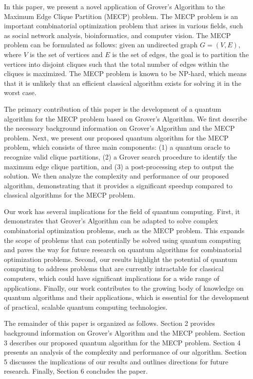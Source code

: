 In this paper, we present a novel application of Grover's Algorithm to the Maximum Edge Clique Partition (MECP) problem. The MECP problem is an important combinatorial optimization problem that arises in various fields, such as social network analysis, bioinformatics, and computer vision. The MECP problem can be formulated as follows: given an undirected graph $G = (V, E)$, where $V$ is the set of vertices and $E$ is the set of edges, the goal is to partition the vertices into disjoint cliques such that the total number of edges within the cliques is maximized. The MECP problem is known to be NP-hard, which means that it is unlikely that an efficient classical algorithm exists for solving it in the worst case.

The primary contribution of this paper is the development of a quantum algorithm for the MECP problem based on Grover's Algorithm. We first describe the necessary background information on Grover's Algorithm and the MECP problem. Next, we present our proposed quantum algorithm for the MECP problem, which consists of three main components: (1) a quantum oracle to recognize valid clique partitions, (2) a Grover search procedure to identify the maximum edge clique partition, and (3) a post-processing step to output the solution. We then analyze the complexity and performance of our proposed algorithm, demonstrating that it provides a significant speedup compared to classical algorithms for the MECP problem.

Our work has several implications for the field of quantum computing. First, it demonstrates that Grover's Algorithm can be adapted to solve complex combinatorial optimization problems, such as the MECP problem. This expands the scope of problems that can potentially be solved using quantum computing and paves the way for future research on quantum algorithms for combinatorial optimization problems. Second, our results highlight the potential of quantum computing to address problems that are currently intractable for classical computers, which could have significant implications for a wide range of applications. Finally, our work contributes to the growing body of knowledge on quantum algorithms and their applications, which is essential for the development of practical, scalable quantum computing technologies.

The remainder of this paper is organized as follows. Section 2 provides background information on Grover's Algorithm and the MECP problem. Section 3 describes our proposed quantum algorithm for the MECP problem. Section 4 presents an analysis of the complexity and performance of our algorithm. Section 5 discusses the implications of our results and outlines directions for future research. Finally, Section 6 concludes the paper.

